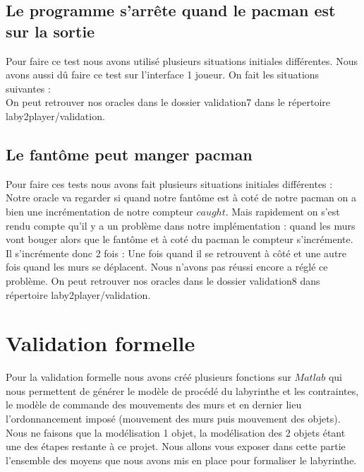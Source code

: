 \subsection{Le programme s’arrête quand le pacman est sur la sortie}
Pour faire ce test nous avons utilisé plusieurs situations initiales différentes. Nous avons aussi dû faire ce test sur l'interface 1 joueur. On fait les situations suivantes :\\
%
On peut retrouver nos oracles dans le dossier validation7 dans le répertoire laby2player/validation.\\


\subsection{Le fantôme peut manger pacman}
Pour faire ces tests nous avons fait plusieurs situations initiales différentes :\\
Notre oracle va regarder si quand notre fantôme est à coté de notre pacman on a bien une incrémentation de notre compteur $caught$. Mais rapidement on s'est rendu compte qu'il y a un problème dans notre implémentation : quand les murs vont bouger alors que le fantôme et à coté du pacman le compteur s'incrémente. Il s'incrémente donc 2 fois : Une fois quand il se retrouvent à côté et une autre fois quand les murs se déplacent. Nous n'avons pas réussi encore a réglé ce problème. On peut retrouver nos oracles dans le dossier validation8 dans répertoire laby2player/validation.\\


\section{Validation formelle}\label{sec:validationFormelle}
Pour la validation formelle nous avons créé plusieurs fonctions sur $Matlab$ qui nous permettent de générer le modèle de procédé du labyrinthe et les contraintes, le modèle de commande des mouvements des murs et en dernier lieu l'ordonnancement imposé (mouvement des murs puis mouvement des objets). Nous ne faisons que la modélisation 1 objet, la modélisation des 2 objets étant une des étapes restante à ce projet. Nous allons vous exposer dans cette partie l'ensemble des moyens que nous avons mis en place pour formaliser le labyrinthe.


